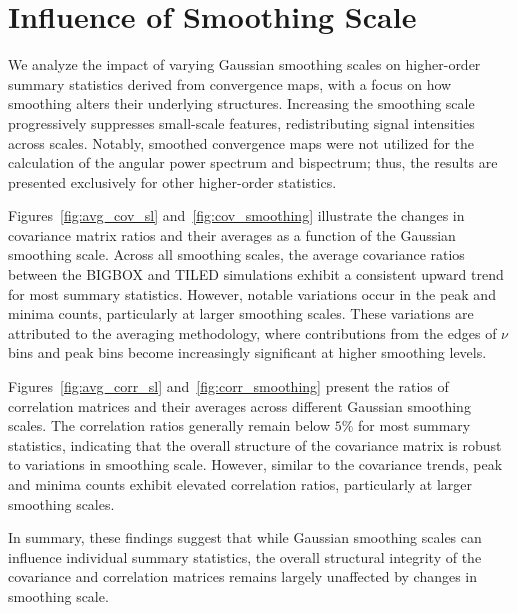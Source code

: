 \clearpage

\section{Influence of Smoothing Scale}
We analyze the impact of varying Gaussian smoothing scales on higher-order summary statistics derived from convergence maps, with a focus on how smoothing alters their underlying structures. Increasing the smoothing scale progressively suppresses small-scale features, redistributing signal intensities across scales. Notably, smoothed convergence maps were not utilized for the calculation of the angular power spectrum and bispectrum; thus, the results are presented exclusively for other higher-order statistics.

Figures~\ref{fig:avg_cov_sl} and~\ref{fig:cov_smoothing} illustrate the changes in covariance matrix ratios and their averages as a function of the Gaussian smoothing scale. Across all smoothing scales, the average covariance ratios between the BIGBOX and TILED simulations exhibit a consistent upward trend for most summary statistics. However, notable variations occur in the peak and minima counts, particularly at larger smoothing scales. These variations are attributed to the averaging methodology, where contributions from the edges of $\nu$ bins and peak bins become increasingly significant at higher smoothing levels.

Figures~\ref{fig:avg_corr_sl} and~\ref{fig:corr_smoothing} present the ratios of correlation matrices and their averages across different Gaussian smoothing scales. The correlation ratios generally remain below $5\%$ for most summary statistics, indicating that the overall structure of the covariance matrix is robust to variations in smoothing scale. However, similar to the covariance trends, peak and minima counts exhibit elevated correlation ratios, particularly at larger smoothing scales.

In summary, these findings suggest that while Gaussian smoothing scales can influence individual summary statistics, the overall structural integrity of the covariance and correlation matrices remains largely unaffected by changes in smoothing scale.


